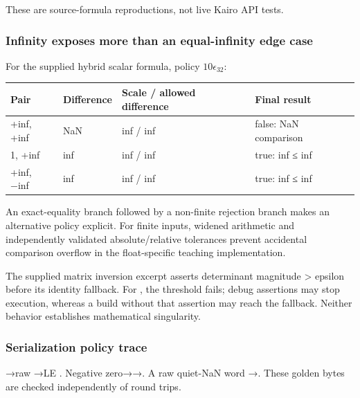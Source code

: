 These are source-formula reproductions, not live Kairo API tests.

\subsubsection{Infinity exposes more than an equal-infinity edge case}\label{appendix-92ff77d4dfdc-infinity-exposes-more-than-an-equal-infinity-edge-case}

\hypertarget{appendix-92ff77d4dfdc-infinity-exposes-more-than-an-equal-infinity-edge-case}{}

For the supplied hybrid scalar formula, policy \(10\epsilon_{32}\):

{\def\LTcaptype{none} %
\begin{longtable}[]{@{}llll@{}}
\toprule\noalign{}
Pair & Difference & Scale / allowed difference & Final result \\
\midrule\noalign{}
\endhead
\bottomrule\noalign{}
\endlastfoot
+inf, +inf & NaN & inf / inf & false: NaN comparison \\
1, +inf & inf & inf / inf & true: inf ≤ inf \\
+inf, −inf & inf & inf / inf & true: inf ≤ inf \\
\end{longtable}
}

An exact-equality branch followed by a non-finite rejection branch makes an alternative policy explicit. For finite inputs, widened arithmetic and independently validated absolute/relative tolerances prevent accidental comparison overflow in the float-specific teaching implementation.

The supplied matrix inversion excerpt asserts determinant magnitude \textgreater{} epsilon before its identity fallback. For , the threshold fails; debug assertions may stop execution, whereas a build without that assertion may reach the fallback. Neither behavior establishes mathematical singularity.

\subsubsection{Serialization policy trace}\label{appendix-92ff77d4dfdc-serialization-policy-trace}

\hypertarget{appendix-92ff77d4dfdc-serialization-policy-trace}{}

→raw →LE . Negative zero→→. A raw quiet-NaN word →. These golden bytes are checked independently of round trips.

